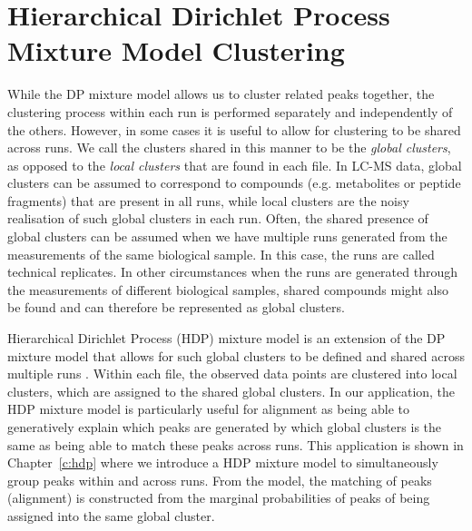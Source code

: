 \section{Hierarchical Dirichlet Process Mixture Model Clustering\label{background-hdp-clustering}}

While the DP mixture model allows us to cluster related peaks together, the clustering process within each run is performed separately and independently of the others. However, in some cases it is useful to allow for clustering to be shared across runs. We call the clusters shared in this manner to be the \emph{global clusters}, as opposed to the \emph{local clusters} that are found in each file. In LC-MS data, global clusters can be assumed to correspond to compounds (e.g. metabolites or peptide fragments) that are present in all runs, while local clusters are the noisy realisation of such global clusters in each run. Often, the shared presence of global clusters can be assumed when we have multiple runs generated from the measurements of the same biological sample. In this case, the runs are called technical replicates. In other circumstances when the runs are generated through the measurements of different biological samples, shared compounds might also be found and can therefore be represented as global clusters.

Hierarchical Dirichlet Process (HDP) mixture model is an extension of the DP mixture model that allows for such global clusters to be defined and shared across multiple runs \cite{teh2005hierarchical,teh2012hierarchical}. Within each file, the observed data points are clustered into local clusters, which are assigned to the shared global clusters. In our application, the HDP mixture model is particularly useful for alignment as being able to generatively explain which peaks are generated by which global clusters is the same as being able to match these peaks across runs. This application is shown in Chapter~\ref{c:hdp} where we introduce a HDP mixture model to simultaneously group peaks within and across runs. From the model, the matching of peaks (alignment) is constructed from the marginal probabilities of peaks of being assigned into the same global cluster. 


